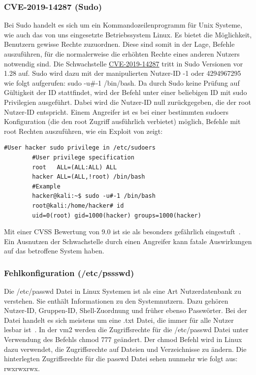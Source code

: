 \documentclass[10pt, a4paper,onecolumn ,titlepage]{article}
\begin{document}
    \subsubsection{CVE-2019-14287 (Sudo)}
    \label{subsubsec:sudo}
    Bei Sudo handelt es sich um ein Kommandozeilenprogramm für Unix Systeme, wie auch das von uns eingesetzte Betriebssystem Linux.
    Es bietet die Möglichkeit, Benutzern gewisse Rechte zuzuordnen.
    Diese sind somit in der Lage, Befehle auszuführen, für die normalerweise die erhöhten Rechte eines anderen Nutzers notwendig sind.
    Die Schwachstelle \href{https://www.cvedetails.com/cve/CVE-2019-14287/?q=CVE-2019-14287}{CVE-2019-14287} tritt in Sudo Versionen vor 1.28 auf.
    Sudo wird dazu mit der manipulierten Nutzer-ID -1 oder 4294967295 wie folgt aufgerufen: \glqq sudo -u\#-1 /bin/bash\grqq.
    Da durch Sudo keine Prüfung auf Gültigkeit der ID stattfindet, wird der Befehl unter einer beliebigen ID mit sudo Privilegien ausgeführt.
    Dabei wird die Nutzer-ID null zurückgegeben, die der root Nutzer-ID entspricht.
    Einem Angreifer ist es bei einer bestimmten sudoers Konfiguration (die den root Zugriff ausführlich verbietet) möglich, Befehle mit root Rechten auszuführen, wie ein Exploit von \textcite{privilegeEscalationSudoExploit} zeigt:
    \vspace{0.5cm}
    \begin{lstlisting}[label={lst:examplesudo}]
        #User hacker sudo privilege in /etc/sudoers
        #User privilege specification
        root   ALL=(ALL:ALL) ALL
        hacker ALL=(ALL,!root) /bin/bash
        #Example
        hacker@kali:~$ sudo -u#-1 /bin/bash
        root@kali:/home/hacker# id
        uid=0(root) gid=1000(hacker) groups=1000(hacker)
    \end{lstlisting}
    \vspace{0.5}
    Mit einer CVSS Bewertung von 9.0 ist sie als besonders gefährlich eingestuft~\parencite{privilegeEscalationSudo}.
    Ein Ausnutzen der Schwachstelle durch einen Angreifer kann fatale Auswirkungen auf das betroffene System haben.



    \subsubsection{Fehlkonfiguration (/etc/pssswd)}
    \label{subsubsec:fehlkonfiguration}
    Die /etc/passwd Datei in Linux Systemen ist als eine Art Nutzerdatenbank zu verstehen.
    Sie enthält Informationen zu den Systemnutzern.
    Dazu gehören Nutzer-ID, Gruppen-ID, Shell-Zuordnung und früher ebenso Passwörter.
    Bei der Datei handelt es sich meistens um eine .txt Datei, die immer für alle Nutzer lesbar ist~\parencite{privilegeEscalationPasswd}.
    In der \ac{vm}2 werden die Zugriffsrechte für die /etc/passwd Datei unter Verwendung des Befehls chmod 777 geändert.
    Der chmod Befehl wird in Linux dazu verwendet, die Zugriffsrechte auf Dateien und Verzeichnisse zu ändern.
    Die hinterlegten Zugriffsrechte für die passwd Datei sehen nunmehr wie folgt aus: rwxrwxrwx.
\end{document}
